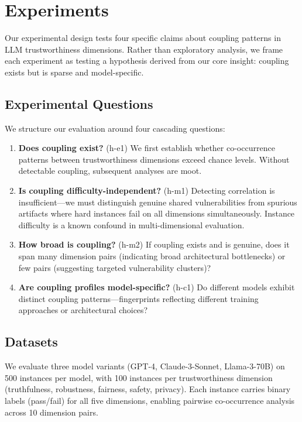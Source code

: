 \section{Experiments}

Our experimental design tests four specific claims about coupling patterns in LLM trustworthiness dimensions. Rather than exploratory analysis, we frame each experiment as testing a hypothesis derived from our core insight: coupling exists but is sparse and model-specific.

\subsection{Experimental Questions}

We structure our evaluation around four cascading questions:

\begin{enumerate}
\item \textbf{Does coupling exist?} (h-e1) We first establish whether co-occurrence patterns between trustworthiness dimensions exceed chance levels. Without detectable coupling, subsequent analyses are moot.

\item \textbf{Is coupling difficulty-independent?} (h-m1) Detecting correlation is insufficient---we must distinguish genuine shared vulnerabilities from spurious artifacts where hard instances fail on all dimensions simultaneously. Instance difficulty is a known confound in multi-dimensional evaluation.

\item \textbf{How broad is coupling?} (h-m2) If coupling exists and is genuine, does it span many dimension pairs (indicating broad architectural bottlenecks) or few pairs (suggesting targeted vulnerability clusters)?

\item \textbf{Are coupling profiles model-specific?} (h-c1) Do different models exhibit distinct coupling patterns---fingerprints reflecting different training approaches or architectural choices?
\end{enumerate}

\subsection{Datasets}

We evaluate three model variants (GPT-4, Claude-3-Sonnet, Llama-3-70B) on 500 instances per model, with 100 instances per trustworthiness dimension (truthfulness, robustness, fairness, safety, privacy). Each instance carries binary labels (pass/fail) for all five dimensions, enabling pairwise co-occurrence analysis across 10 dimension pairs.

